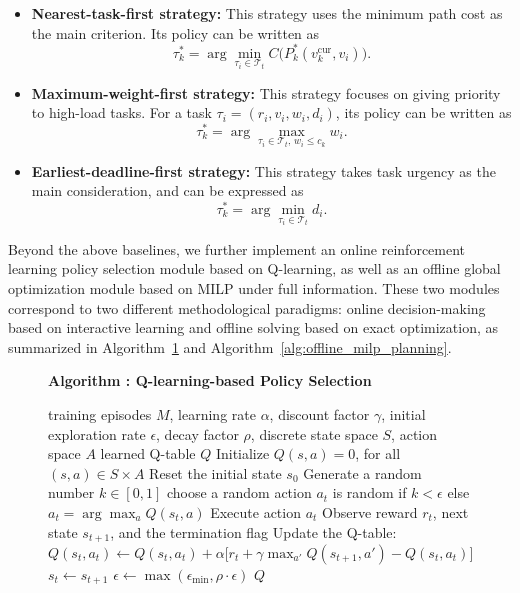 \begin{itemize}
\item \textbf{Nearest-task-first strategy:} This strategy uses the minimum path cost as the main criterion. Its policy can be written as
\[
\tau_k^*=\arg\min_{\tau_i\in \mathcal{T}_t} C\bigl(P_k^*(v_k^{\text{cur}}, v_i)\bigr).
\]

\item \textbf{Maximum-weight-first strategy:} This strategy focuses on giving priority to high-load tasks. For a task \(\tau_i=(r_i,v_i,w_i,d_i)\), its policy can be written as
\[
\tau_k^*=\arg\max_{\tau_i\in \mathcal{T}_t,\, w_i\le c_k} w_i.
\]

\item \textbf{Earliest-deadline-first strategy:} This strategy takes task urgency as the main consideration, and can be expressed as
\[
\tau_k^*=\arg\min_{\tau_i\in \mathcal{T}_t} d_i.
\]
\end{itemize}

Beyond the above baselines, we further implement an online reinforcement learning policy selection module based on Q-learning, as well as an offline global optimization module based on MILP under full information. These two modules correspond to two different methodological paradigms: online decision-making based on interactive learning and offline solving based on exact optimization, as summarized in Algorithm~\ref{alg:qlearning_policy} and Algorithm~\ref{alg:offline_milp_planning}.

\begin{figure}[t]
  \centering
  \label{alg:qlearning_policy}
  \begin{minipage}{0.96\textwidth}
  \textbf{Algorithm \thefigure: Q-learning-based Policy Selection}
  \vspace{0.4em}
  \begin{algorithmic}[1]
  \Require training episodes \(M\), learning rate \(\alpha\), discount factor \(\gamma\), initial exploration rate \(\epsilon\), decay factor \(\rho\), discrete state space \(S\), action space \(A\)
  \Ensure learned Q-table \(Q\)
  \State Initialize \(Q(s,a)=0\), for all \((s,a)\in S\times A\)
      \State Reset the initial state \(s_0\)
          \State Generate a random number $k \in [0,1]$
          \State choose a random action \(a_t\) is random if $k<\epsilon$ else \(a_t=\arg\max_a Q(s_t,a)\)
          \State Execute action \(a_t\)
          \State Observe reward \(r_t\), next state \(s_{t+1}\), and the termination flag
          \State Update the Q-table:
          \State $Q(s_t,a_t)\leftarrow Q(s_t,a_t)+\alpha\bigl[r_t+\gamma \max_{a'}Q(s_{t+1},a')-Q(s_t,a_t)\bigr]$
          \State \(s_t \leftarrow s_{t+1}\)
      \EndWhile
      \State \(\epsilon \leftarrow \max(\epsilon_{\min}, \rho\cdot \epsilon)\)
  \EndFor
  \State \Return \(Q\)
  \end{algorithmic}
  \end{minipage}
\end{figure}

